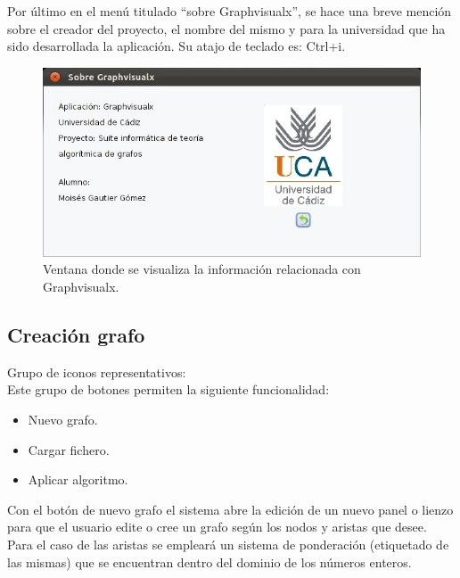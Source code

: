 Por último en el menú titulado ``sobre Graphvisualx'', se hace una breve mención sobre el creador del proyecto, el nombre del mismo y para la universidad que ha sido desarrollada la aplicación. Su atajo de teclado es: Ctrl+i. \\

\begin{figure}[H]
\begin{center}
\includegraphics[width=17cm]{./imagenes_documentacion/imagen_sobre_graphvisualx.jpeg}
\caption{Ventana donde se visualiza la información relacionada con Graphvisualx.}
\end{center}
\end{figure}

\subsection{Creación grafo}

Grupo de iconos representativos:  \\

Este grupo de botones permiten la siguiente funcionalidad:

\begin{itemize}
\item Nuevo grafo. \quad {}
\item Cargar fichero. \quad {}
\item Aplicar algoritmo. \quad {}
\end{itemize}

Con el botón de nuevo grafo el sistema abre la edición de un nuevo panel o lienzo para que el usuario edite o cree un grafo según los nodos y aristas que desee. Para el caso de las aristas se empleará un sistema de ponderación (etiquetado de las mismas) que se encuentran dentro del dominio de los números enteros.  \\

